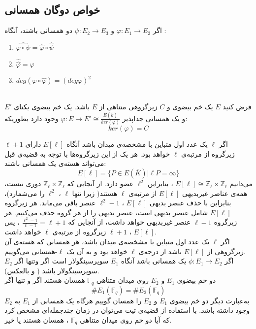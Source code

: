 \subsection{خواص دوگان همسانی}
اگر
$\varphi : E_1 \longrightarrow E_2$
و
$\psi : E_2 \longrightarrow E_3$
دو همسانی باشند، آنگاه :
\begin{enumerate}[label=\alph*.]
\item{
$ \widehat{\varphi \circ \psi} = \hat{\varphi} \circ \hat{\psi}$
}

\item{
$ \hat{ \hat{ \varphi } } = \varphi$
}
\item{
$ deg(\varphi \circ \hat{ \varphi }) = (deg \varphi)^2 $
}
\end{enumerate}~
\\
\theorem 
فرض کنید
$E$
یک خم بیضوی و 
$C$
زیرگروهی متناهی از 
$E$
باشد. یک خم بیضوی یکتای
$E'$
و یک همسانی جداپذیر
$\varphi : E \longrightarrow E' \cong \frac{E(\bar{k})}{ker(\varphi)}$
 وجود دارد بطوریکه:
$$ ker(\varphi) = C $$

\proposition
اگر
$\ell$
یک عدد اول متباین با مشخصه‌ی میدان باشد آنگاه 
$E[\ell]$
دارای 
$\ell + 1$
زیرگروه از مرتبه‌ی
$\ell$
خواهد بود. هر یک از این زیرگروه‌ها با توجه به قضیه‌ی قبل می‌تواند هسته‌ی یک همسانی باشند:
$$ E[\ell] = \{ P \in E(\bar{K}) | \ell P = \infty \} $$
می‌دانیم 
$E[\ell] \cong \mathbb{Z}_{\ell} \times \mathbb{Z}_{\ell}$
، بنابراین 
${\ell}^2$
عضو دارد. از آنجایی که
$\mathbb{Z}_{\ell} \times \mathbb{Z}_{\ell}$
دوری نیست، همه‌ی عناصر غیربدیهی 
$E[\ell]$
از مرتبه‌ی 
$\ell$
هستند( زیرا تنها 
$\ell$
،
${\ell}^2$
را می‌شمارد)، بنابراین با حذف عنصر بدیهی
$E[\ell]$
، 
${\ell}^2-1$
عنصر باقی می‌ماند. هر زیرگروه
$E[\ell]$
شامل عنصر بدیهی است، عنصر بدیهی را از هر گروه حذف می‌کنیم. هر زیرگروه 
$\ell -1$
عنصر غیربدیهی خواهد داشت، از آنجایی که
$\frac{{\ell}^2-1}{{\ell}-1} = \ell + 1$
، پس
$E[\ell]$
،
${\ell}+1$
زیرگروه از مرتبه‌ی
$\ell$
خواهد داشت.
\\
\proposition
اگر
$\ell$
یک عدد اول متباین با مشخصه‌ی میدان باشد، هر همسانی که هسته‌ی آن زیرگروهی از
$E[\ell]$
باشد از درجه‌ی 
$\ell$
خواهد بود و به آن یک 
$\ell$-همسانی
می‌گوییم.
\\
\theorem
اگر
$\phi : E_1 \longrightarrow E_2$
یک همسانی باشد آنگاه
$E_1$
سوپرسینگولار است اگر وتنها اگر
$E_2$
سوپرسینگولار باشد ( و بالعکس).
\\
\theorem[تیت]
دو خم بیضوی
$E_1$
و
$E_2$
روی میدان متناهی
$\mathbb{F}_q$
همسان هستند اگر و تنها اگر
$$ \# E_1(\mathbb{F}_q) = \# E_2(\mathbb{F}_q) $$
به‌عبارت دیگر دو خم بیضوی
$E_1$
و
$E_2$
را همسان گوییم هرگاه یک همسانی از
$E_1$
به
$E_2$
وجود داشته باشد.
\corollary
با استفاده از قضیه‌ی تیت می‌توان در زمان چندجمله‌ای مشخص کرد که آیا دو خم روی میدان متناهی
$\mathbb{F}_q$
، همسان هستند یا خیر.
\\
